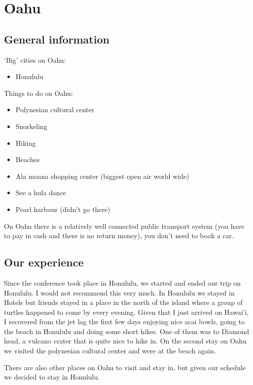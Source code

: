 \documentclass[11pt,a4paper,sans,english]{article}
\begin{document}
\section{Oahu}

\subsection{General information}
`Big' cities on Oahu:
\begin{itemize}
	\itemsep-0.5em 
	\item Honululu
\end{itemize}
Things to do on Oahu:
\begin{itemize}
	\itemsep-0.5em 
	\item Polynesian cultural center
	\item Snorkeling
	\item Hiking
	\item Beaches
	\item Ala moana shopping center (biggest open air world wide)
	\item See a hula dance
	\item Pearl harbour (didn't go there)
\end{itemize}
On Oahu there is a relatively well connected public transport system (you have to pay in cash and there is no return money), you don't need to book a car.
\subsection{Our experience}
Since the conference took place in Honululu, we started and ended our trip on Honululu. I would not recommend this very much.
In Honululu we stayed in Hotels but friends stayed in a place in the north of the island where a group of turtles happened to come by every evening.
Given that I just arrived on Hawai'i, I recovered from the jet lag the first few days enjoying nice acai bowls, going to the beach in Honululu and doing some short hikes. One of them was to Diamond head, a vulcano crater that is quite nice to hike in. On the second stay on Oahu we visited the polynesian cultural center and were at the beach again.

There are also other places on Oahu to visit and stay in, but given our schedule we decided to stay in Honululu.
\end{document}
